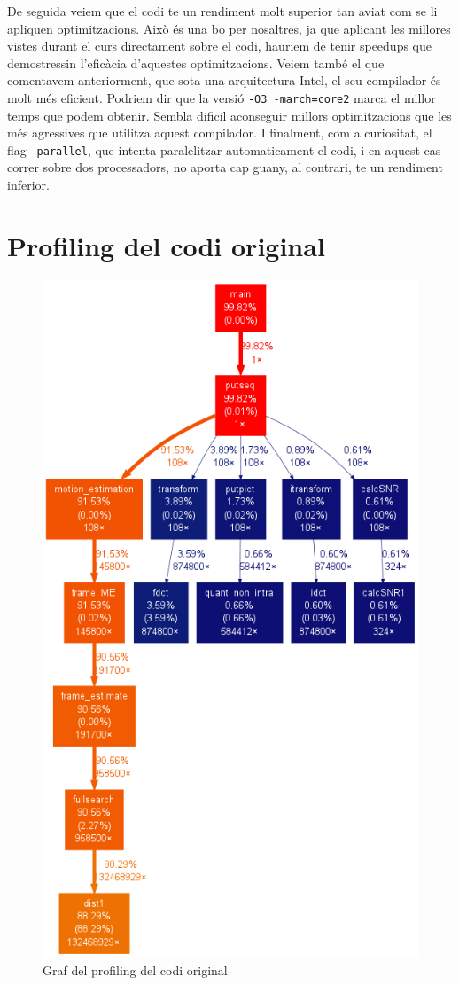 De seguida veiem que el codi te un rendiment molt superior tan aviat com se li apliquen optimitzacions. Això és una bo per nosaltres, ja que aplicant les millores vistes durant el curs directament sobre el codi, hauriem de tenir speedups que demostressin l'eficàcia d'aquestes optimitzacions.
Veiem també el que comentavem anteriorment, que sota una arquitectura Intel, el seu compilador és molt més eficient. Podriem dir que la versió \texttt{-O3 -march=core2} marca el millor temps que podem obtenir. Sembla dificil aconseguir millors optimitzacions que les més agressives que utilitza aquest compilador.
I finalment, com a curiositat, el flag \texttt{-parallel}, que intenta paralelitzar automaticament el codi, i en aquest cas correr sobre dos processadors, no aporta cap guany, al contrari, te un rendiment inferior.

\section{Profiling del codi original}

\begin{figure}[hbtp]
\begin{center}
\includegraphics[scale=0.4]{img/output.png}
\caption{Graf del profiling del codi original}
\end{center}
\end{figure}

